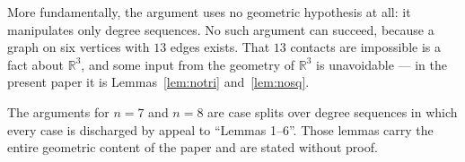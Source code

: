 \documentclass[11pt,a4paper]{article}
\theoremstyle{plain}
\theoremstyle{definition}
\newcommand{\R}{\mathbb{R}}
\begin{document}
More fundamentally, the argument uses no geometric hypothesis at all: it manipulates
only degree sequences. No such argument can succeed, because a graph on six vertices
with $13$ edges exists. That $13$ contacts are impossible is a fact about $\R^3$, and
some input from the geometry of $\R^3$ is unavoidable --- in the present paper it is
Lemmas~\ref{lem:notri} and~\ref{lem:nosq}.

The arguments for $n = 7$ and $n = 8$ are case splits over degree sequences in which
every case is discharged by appeal to ``Lemmas 1--6''. Those lemmas carry the entire
geometric content of the paper and are stated without proof.



\end{document}
